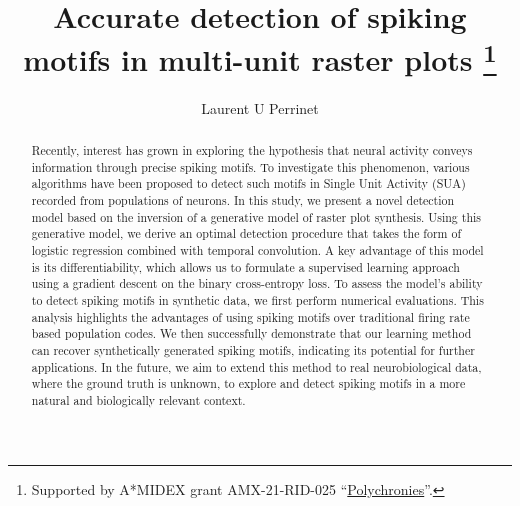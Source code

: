 \documentclass[runningheads]{llncs}
\begin{document}
\title{Accurate detection of spiking motifs in multi-unit raster plots
\thanks{Supported by A*MIDEX grant AMX-21-RID-025 ``\href{https://laurentperrinet.github.io/grant/polychronies/}{Polychronies}''.}
}

\author{
Laurent U Perrinet
}
%
%
%
\maketitle              %
%
\begin{abstract} 
  Recently, interest has grown in exploring the hypothesis that neural activity conveys information through precise spiking motifs. To investigate this phenomenon, various algorithms have been proposed to detect such motifs in Single Unit Activity (SUA) recorded from populations of neurons.
  In this study, we present a novel detection model based on the inversion of a generative model of raster plot synthesis. Using this generative model, we derive an optimal detection procedure that takes the form of logistic regression combined with temporal convolution. A key advantage of this model is its differentiability, which allows us to formulate a supervised learning approach using a gradient descent on the binary cross-entropy loss. 
  To assess the model's ability to detect spiking motifs in synthetic data, we first perform numerical evaluations. This analysis highlights the advantages of using spiking motifs over traditional firing rate based population codes. We then successfully demonstrate that our learning method can recover synthetically generated spiking motifs, indicating its potential for further applications. In the future, we aim to extend this method to real neurobiological data, where the ground truth is unknown, to explore and detect spiking motifs in a more natural and biologically relevant context.
%
\end{abstract}

\end{document}
